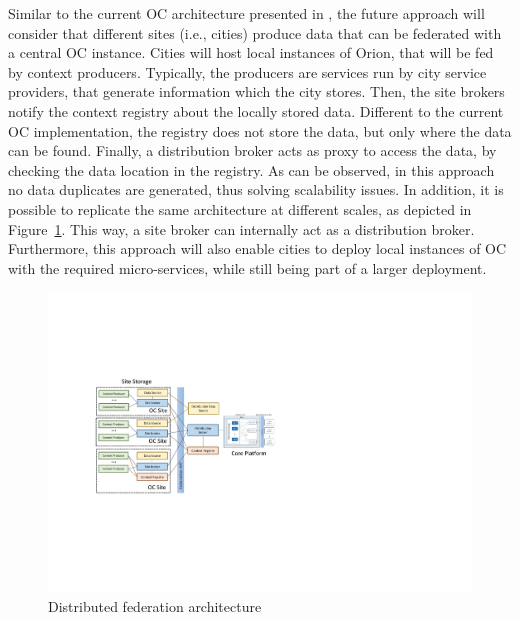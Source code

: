 Similar to the current OC architecture presented in , the future approach will consider that different sites (i.e., cities) produce data that can be federated with a central OC instance. Cities will host local instances of Orion, that will be fed by context producers. Typically, the producers are services run by city service providers, that generate information which the city stores. Then, the site brokers notify the context registry about the locally stored data. Different to the current OC implementation, the registry does not store the data, but only where the data can be found. Finally, a distribution broker acts as proxy to access the data, by checking the data location in the registry. As can be observed, in this approach no data duplicates are generated, thus solving scalability issues. In addition, it is possible to replicate the same architecture at different scales, as depicted in Figure~\ref{fig:arch2}. This way, a site broker can internally act as a distribution broker. Furthermore, this approach will also enable cities to deploy local instances of OC with the required micro-services, while still being part of a larger deployment.

\begin{figure}
	\centering
	\includegraphics[width=\columnwidth]{figures/archExt}
	\caption{Distributed federation architecture}
	\label{fig:arch2}	
\end{figure}